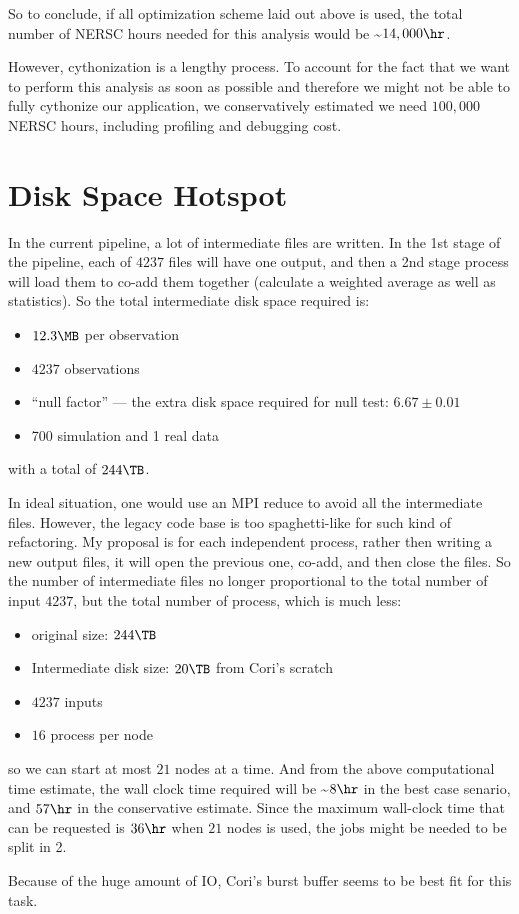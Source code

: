 \documentclass[12pt,english,letterpaper,article]{memoir}
\providecommand{\tightlist}{%
  \setlength{\itemsep}{0pt}\setlength{\parskip}{0pt}}
\begin{document}
So to conclude, if all optimization scheme laid out above is used, the
total number of NERSC hours needed for this analysis would be
\sim \(14,000 \hr\).

However, cythonization is a lengthy process. To account for the fact
that we want to perform this analysis as soon as possible and therefore
we might not be able to fully cythonize our application, we
conservatively estimated we need \(100,000\) NERSC hours, including
profiling and debugging cost.

\chapter{Disk Space Hotspot}\label{disk-space-hotspot}

In the current pipeline, a lot of intermediate files are written. In the
1st stage of the pipeline, each of \(4237\) files will have one output,
and then a 2nd stage process will load them to co-add them together
(calculate a weighted average as well as statistics). So the total
intermediate disk space required is:

\begin{itemize}
\tightlist
\item
  \(12.3 \MB\) per observation
\item
  \(4237\) observations
\item
  ``null factor'' --- the extra disk space required for null test:
  \(6.67 \pm 0.01\)
\item
  700 simulation and 1 real data
\end{itemize}

with a total of \(244\TB\).

In ideal situation, one would use an MPI reduce to avoid all the
intermediate files. However, the legacy code base is too spaghetti-like
for such kind of refactoring. My proposal is for each independent
process, rather then writing a new output files, it will open the
previous one, co-add, and then close the files. So the number of
intermediate files no longer proportional to the total number of input
\(4237\), but the total number of process, which is much less:

\begin{itemize}
\tightlist
\item
  original size: \(244\TB\)
\item
  Intermediate disk size: \(20\TB\) from Cori's scratch
\item
  \(4237\) inputs
\item
  \(16\) process per node
\end{itemize}

so we can start at most \(21\) nodes at a time. And from the above
computational time estimate, the wall clock time required will be
\sim \(8 \hr\) in the best case senario, and \(57 \hr\) in the
conservative estimate. Since the maximum wall-clock time that can be
requested is \(36 \hr\) when \(21\) nodes is used, the jobs might be
needed to be split in 2.

Because of the huge amount of IO, Cori's burst buffer seems to be best
fit for this task.
\end{document}
